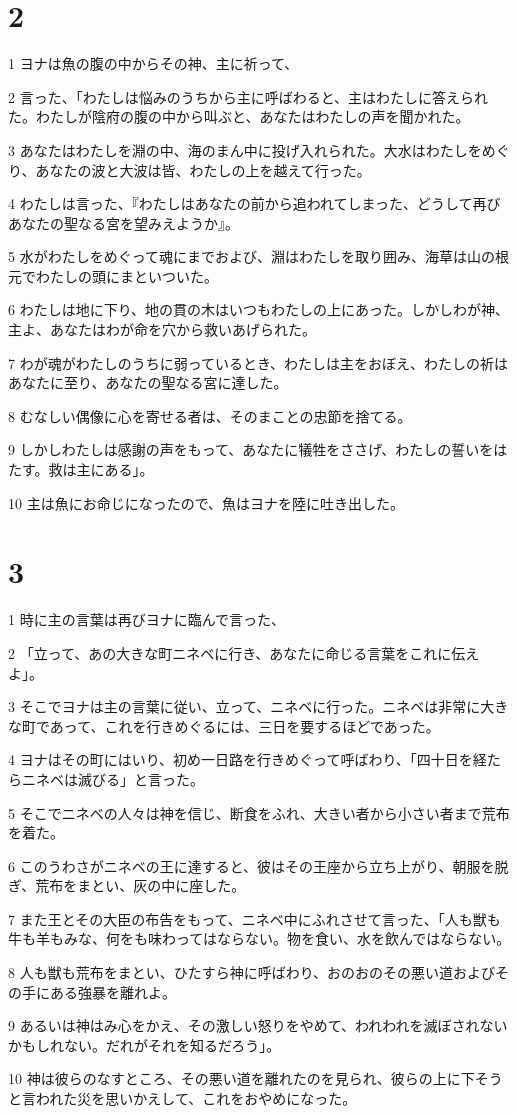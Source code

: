 \chapter{2}

\par 1 ヨナは魚の腹の中からその神、主に祈って、
\par 2 言った、「わたしは悩みのうちから主に呼ばわると、主はわたしに答えられた。わたしが陰府の腹の中から叫ぶと、あなたはわたしの声を聞かれた。
\par 3 あなたはわたしを淵の中、海のまん中に投げ入れられた。大水はわたしをめぐり、あなたの波と大波は皆、わたしの上を越えて行った。
\par 4 わたしは言った、『わたしはあなたの前から追われてしまった、どうして再びあなたの聖なる宮を望みえようか』。
\par 5 水がわたしをめぐって魂にまでおよび、淵はわたしを取り囲み、海草は山の根元でわたしの頭にまといついた。
\par 6 わたしは地に下り、地の貫の木はいつもわたしの上にあった。しかしわが神、主よ、あなたはわが命を穴から救いあげられた。
\par 7 わが魂がわたしのうちに弱っているとき、わたしは主をおぼえ、わたしの祈はあなたに至り、あなたの聖なる宮に達した。
\par 8 むなしい偶像に心を寄せる者は、そのまことの忠節を捨てる。
\par 9 しかしわたしは感謝の声をもって、あなたに犠牲をささげ、わたしの誓いをはたす。救は主にある」。
\par 10 主は魚にお命じになったので、魚はヨナを陸に吐き出した。

\chapter{3}

\par 1 時に主の言葉は再びヨナに臨んで言った、
\par 2 「立って、あの大きな町ニネベに行き、あなたに命じる言葉をこれに伝えよ」。
\par 3 そこでヨナは主の言葉に従い、立って、ニネベに行った。ニネベは非常に大きな町であって、これを行きめぐるには、三日を要するほどであった。
\par 4 ヨナはその町にはいり、初め一日路を行きめぐって呼ばわり、「四十日を経たらニネベは滅びる」と言った。
\par 5 そこでニネベの人々は神を信じ、断食をふれ、大きい者から小さい者まで荒布を着た。
\par 6 このうわさがニネベの王に達すると、彼はその王座から立ち上がり、朝服を脱ぎ、荒布をまとい、灰の中に座した。
\par 7 また王とその大臣の布告をもって、ニネベ中にふれさせて言った、「人も獣も牛も羊もみな、何をも味わってはならない。物を食い、水を飲んではならない。
\par 8 人も獣も荒布をまとい、ひたすら神に呼ばわり、おのおのその悪い道およびその手にある強暴を離れよ。
\par 9 あるいは神はみ心をかえ、その激しい怒りをやめて、われわれを滅ぼされないかもしれない。だれがそれを知るだろう」。
\par 10 神は彼らのなすところ、その悪い道を離れたのを見られ、彼らの上に下そうと言われた災を思いかえして、これをおやめになった。

